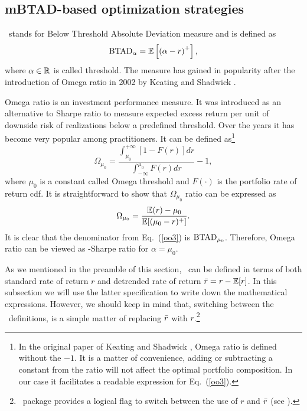 
\subsection{mBTAD-based optimization strategies}\label{S:mBTAD}

\BTAD\ stands for Below Threshold Absolute Deviation measure and is defined as
\begin{equation}
    \BTAD_\alpha = \mE\left[\left(\alpha - r\right)^+ \right],
    \label{oo1}
\end{equation}
where $\alpha \in {\mathbb R}$ is called threshold.
The measure has gained in popularity after the introduction of
Omega ratio in 2002 by Keating and Shadwick \cite{Keating}.

Omega ratio is an investment performance measure. It was introduced as an alternative to Sharpe ratio
to measure expected excess return per unit of downside risk of realizations below a predefined threshold.
Over the years it has become very popular among practitioners.
It can be defined as\footnote{In the original paper of Keating and Shadwick \cite{Keating}, Omega ratio is defined without the $-1$.
It is a matter of convenience, adding or subtracting a constant from the ratio will not affect the optimal portfolio
composition. In our case it facilitates a readable expression for Eq.~(\ref{oo3}).}
\begin{equation}
    \Omega_{\mu_0} = \frac{\int_{\mu_0}^{+\infty} [1 - F(r)] dr}{\int_{-\infty}^{\mu_0} F(r) dr} - 1,
    \label{oo2}
\end{equation}
where $\mu_0$ is a constant called Omega threshold and $F(\cdot)$ is the portfolio rate of return cdf.
It is straightforward to show that $\Omega_{\mu_0}$ ratio can be expressed as
\begin{equation}
    \Omega_{\mu_0} = \frac{\mE(r) - \mu_0}{\mE[(\mu_0 - r)^+]}.
    \label{oo3}
\end{equation}
It is clear that the denominator from Eq.~(\ref{oo3}) is ${\rm BTAD}_{\mu_0}$. Therefore, Omega ratio can be viewed as
\BTAD-Sharpe ratio for $\alpha=\mu_0$.

As we mentioned in the preamble of this section, \BTAD\ can be defined in terms of both standard rate of return $r$ and
detrended rate of return ${\bar r} = r - {\mathbb E}[r]$. In this subsection we will use the latter specification to write down the mathematical expressions. However, we should keep in
mind that, switching between the \BTAD\ definitions, is a simple matter of replacing ${\bar r}$ with $r$.\footnote{\azapy\ package provides a logical
flag to switch between the use of $r$ and ${\bar r}$ (see \azapydoc).}

